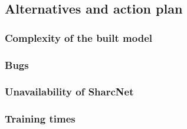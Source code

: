 \subsection{Alternatives and action plan}


\subsubsection{Complexity of the built model}

\subsubsection{Bugs}

\subsubsection{Unavailability of SharcNet}

\subsubsection{Training times}

